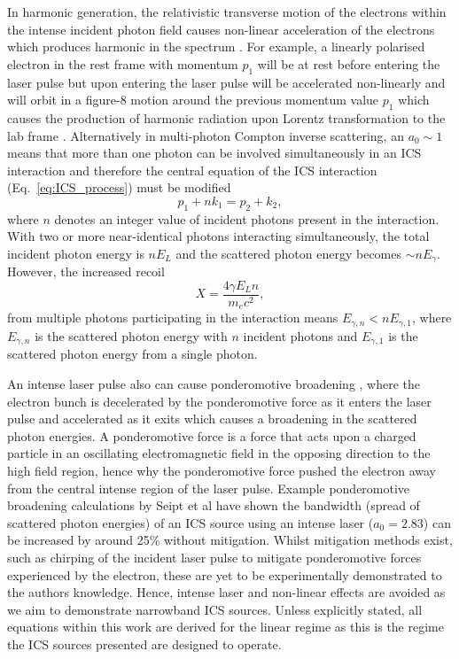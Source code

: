 \documentclass[../main.tex]{subfiles}
\begin{document}
In harmonic generation, the relativistic transverse motion of the electrons within the intense incident photon field causes non-linear acceleration of the electrons which produces harmonic in the spectrum \cite{brown1964interaction, sarachik1970classical,englert1983second}. For example, a linearly polarised electron in the rest frame with momentum $p_{1}$ will be at rest before entering the laser pulse but upon entering the laser pulse will be accelerated non-linearly and will orbit in a figure-8 motion around the previous momentum value $p_{1}$ which causes the production of harmonic radiation upon Lorentz transformation to the lab frame \cite{sarachik1970classical}. Alternatively in multi-photon Compton inverse scattering, an $a_{0}\sim 1$ means that more than one photon can be involved simultaneously in an ICS interaction and therefore the central equation of the ICS interaction (Eq.~\ref{eq:ICS_process}) must be modified \cite{bula1996observation,seipt2011nonlinear}
\begin{equation}
p_{1} + \mathit{n}k_{1} = p_{2} + k_{2},
\label{eq:nonlinear_electron_photon_interaction}    
\end{equation}
where $\mathit{n}$ denotes an integer value of incident photons present in the interaction. With two or more near-identical photons interacting simultaneously, the total incident photon energy is $n E_{L}$ and the scattered photon energy becomes $\sim \mathit{n}E_{\gamma}$. However, the increased recoil
\begin{equation}
X = \frac{4\gamma E_{L}n}{m_{e}c^{2}},
\label{eq:multiphoton_recoil}    
\end{equation}
from multiple photons participating in the interaction means $E_{\gamma,n} < nE_{\gamma,1}$, where $E_{\gamma,n}$ is the scattered photon energy with $n$ incident photons and $E_{\gamma,1}$ is the scattered photon energy from a single photon.

An intense laser pulse also can cause ponderomotive broadening \cite{krafft2004spectral}, where the electron bunch is decelerated by the ponderomotive force as it enters the laser pulse and accelerated as it exits which causes a broadening in the scattered photon energies. A ponderomotive force is a force that acts upon a charged particle in an oscillating electromagnetic field in the opposing direction to the high field region, hence why the ponderomotive force pushed the electron away from the central intense region of the laser pulse. Example ponderomotive broadening calculations by Seipt et al \cite{seipt2015narrowband} have shown the bandwidth (spread of scattered photon energies) of an ICS source using an intense laser ($a_{0} = 2.83$) can be increased by around 25\% without mitigation. Whilst mitigation methods exist, such as chirping of the incident laser pulse \cite{ghebregziabher2013spectralterzic2014narrow,terzic2019improving} to mitigate ponderomotive forces experienced by the electron, these are yet to be experimentally demonstrated to the authors knowledge. Hence, intense laser and non-linear effects are avoided as we aim to demonstrate narrowband ICS sources. Unless explicitly stated, all equations within this work are derived for the linear regime as this is the regime the ICS sources presented are designed to operate. 
\end{document}
